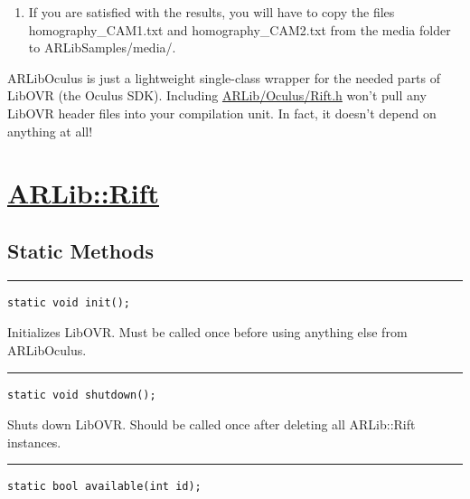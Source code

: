 \documentclass[]{article}
\begin{document}
\begin{enumerate}
\item
  If you are satisfied with the results, you will have to copy the files
  homography\_CAM1.txt and homography\_CAM2.txt from the media folder to
  ARLibSamples/media/.
\end{enumerate}

ARLibOculus is just a lightweight single-class wrapper for the needed
parts of LibOVR (the Oculus SDK). Including
\href{https://github.com/ands/OculusMeetsAR/blob/master/ARLib/include/ARLib/Oculus/Rift.h}{ARLib/Oculus/Rift.h}
won't pull any LibOVR header files into your compilation unit. In fact,
it doesn't depend on anything at all!

\section{\texorpdfstring{\href{https://github.com/ands/OculusMeetsAR/blob/master/ARLib/include/ARLib/Oculus/Rift.h}{ARLib::Rift}}{ARLib::Rift}}\label{arlibrift}

\subsection{Static Methods}\label{static-methods}

\begin{center}\rule{0.5\linewidth}{\linethickness}\end{center}

\begin{verbatim}
static void init();
\end{verbatim}

Initializes LibOVR. Must be called once before using anything else from
ARLibOculus.

\begin{center}\rule{0.5\linewidth}{\linethickness}\end{center}

\begin{verbatim}
static void shutdown();
\end{verbatim}

Shuts down LibOVR. Should be called once after deleting all ARLib::Rift
instances.

\begin{center}\rule{0.5\linewidth}{\linethickness}\end{center}

\begin{verbatim}
static bool available(int id);
\end{verbatim}
\end{document}
